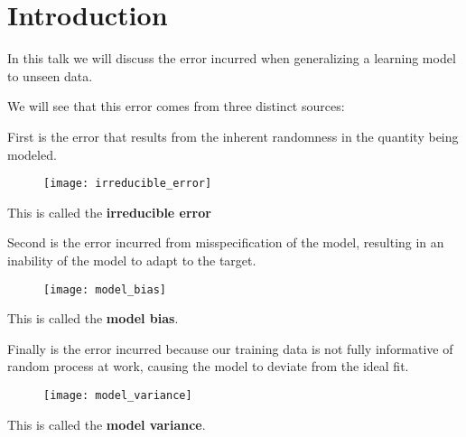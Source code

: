 \section{Introduction}
%
%
\begin{frame}
  In this talk we will discuss the error incurred when generalizing a learning
  model to unseen data.
\end{frame}
%
%
\begin{frame}
  We will see that this error comes from three distinct sources:
\end{frame}
%
%
\begin{frame}
  First is the error that results from the inherent randomness in the quantity
  being modeled.

  \begin{figure}
    \texttt{[image: irreducible\_error]}
  \end{figure}

  This is called the \textbf{irreducible error}
\end{frame}
%
%
\begin{frame}
  Second is the error incurred from misspecification of the model, resulting in
  an inability of the model to adapt to the target.

  \begin{figure}
    \texttt{[image: model\_bias]}
  \end{figure}

  This is called the \textbf{model bias}.
\end{frame}
%
%
\begin{frame}
  Finally is the error incurred because our training data is not fully
  informative of random process at work, causing the model to deviate from the
  ideal fit.

  \begin{figure}
    \texttt{[image: model\_variance]}
  \end{figure}

  This is called the \textbf{model variance}.
\end{frame}
